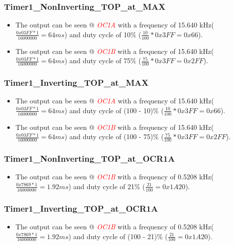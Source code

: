 \documentclass[oneside]{book}
\newcommand{\pinFormat}[1]{\emph{\textcolor{red}{#1}}}
\begin{document}
\subsubsection{Timer1\_NonInverting\_TOP\_at\_MAX}
\begin{itemize}
    \item The output can be seen @ \pinFormat{OC1A} with a frequency of 15.640 kHz($\frac{0x03FF * 1}{16000000} = 64 ms$) and duty cycle of 10\% ($\frac{10}{100} * 0x3FF = 0x66$).
    \item The output can be seen @ \pinFormat{OC1B} with a frequency of 15.640 kHz($\frac{0x03FF * 1}{16000000} = 64 ms$) and duty cycle of 75\% ($\frac{75}{100} * 0x3FF = 0x2FF$).
\end{itemize}
\subsubsection{Timer1\_Inverting\_TOP\_at\_MAX}
\begin{itemize}
    \item The output can be seen @ \pinFormat{OC1A} with a frequency of 15.640 kHz($\frac{0x03FF * 1}{16000000} = 64 ms$) and duty cycle of (100 - 10)\% ($\frac{10}{100} * 0x3FF = 0x66$).
    \item The output can be seen @ \pinFormat{OC1B} with a frequency of 15.640 kHz($\frac{0x03FF * 1}{16000000} = 64 ms$) and duty cycle of (100 - 75)\% ($\frac{75}{100} * 0x3FF = 0x2FF$).
\end{itemize}
\subsubsection{Timer1\_NonInverting\_TOP\_at\_OCR1A}
\begin{itemize}
    \item The output can be seen @ \pinFormat{OC1B} with a frequency of 0.5208 kHz($\frac{0x7869 * 1}{16000000} = 1.92 ms$) and duty cycle of 21\% ($\frac{21}{100} = 0x1A20$).
\end{itemize}
\subsubsection{Timer1\_Inverting\_TOP\_at\_OCR1A}
\begin{itemize}
    \item The output can be seen @ \pinFormat{OC1B} with a frequency of 0.5208 kHz($\frac{0x7869 * 1}{16000000} = 1.92 ms$) and duty cycle of (100 - 21)\% ($\frac{21}{100} = 0x1A20$).
\end{itemize}
\end{document}

